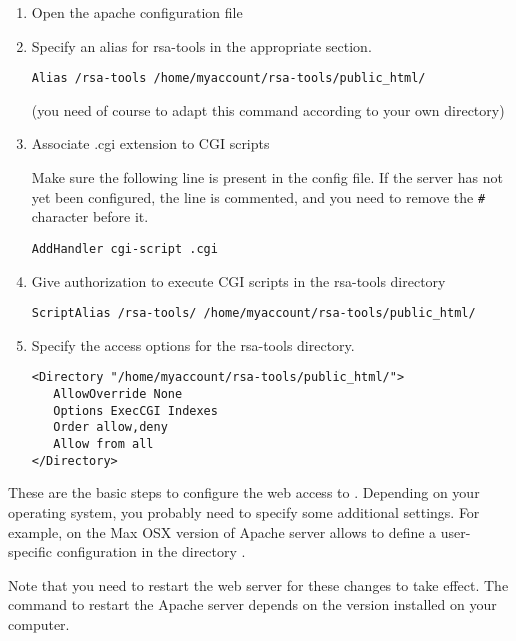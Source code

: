 \documentclass[12pt,a4paper, twoside]{scrreprt} %
\begin{document}
\begin{enumerate}
\item Open the apache configuration file 

\item Specify an alias for rsa-tools in the appropriate section.

\begin{verbatim}
Alias /rsa-tools /home/myaccount/rsa-tools/public_html/
\end{verbatim}

  (you need of course to adapt this command according to your own
  \RSAT directory)

\item Associate .cgi extension to CGI scripts

Make sure the following line is present in the config file. If the
server has not yet been configured, the line is commented, and you
need to remove the \texttt{\#} character before it.

\begin{verbatim}
AddHandler cgi-script .cgi
\end{verbatim}

\item Give authorization to execute CGI scripts in the rsa-tools directory

\begin{verbatim}
ScriptAlias /rsa-tools/ /home/myaccount/rsa-tools/public_html/
\end{verbatim}

\item Specify the access options for the rsa-tools directory.

\begin{verbatim}
<Directory "/home/myaccount/rsa-tools/public_html/">
   AllowOverride None
   Options ExecCGI Indexes
   Order allow,deny
   Allow from all
</Directory>
\end{verbatim}

\end{enumerate}

These are the basic steps to configure the web access to
\RSAT. Depending on your operating system, you probably need to
specify some additional settings. For example, on the Max OSX version
of Apache server allows to define a user-specific configuration in the
directory .

Note that you need to restart the web server for these changes to take
effect. The command to restart the Apache server depends on the
version installed on your computer. 
\end{document}
